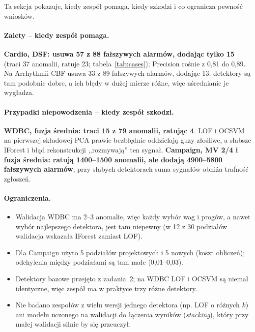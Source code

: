 \documentclass[11pt,a4paper]{article}
\begin{document}
Ta sekcja pokazuje, kiedy zespół pomaga, kiedy szkodzi i co ogranicza
pewność wniosków.

\begin{table}[H]
  \centering\small
  \caption{Decyzje zespołów a decyzje najlepszego pojedynczego detektora
  (część testowa, suma po podziałach): anomalie wykryte tylko przez zespół
  (uratowane) i tylko przez detektor (utracone) oraz fałszywe alarmy
  usunięte i dodane przez zespół.}
  \label{tab:cases}
\end{table}

\paragraph{Zalety -- kiedy zespół pomaga.} \textbf{Cardio, DSF: usuwa 57
z 88 fałszywych alarmów, dodając tylko 15} (traci 37 anomalii, ratuje 23;
tabela~\ref{tab:cases}); Precision rośnie z 0,81 do 0,89. Na Arrhythmii CBF
usuwa 33 z 89 fałszywych alarmów, dodając 13: detektory są tam podobnie
dobre, a ich błędy w dużej mierze różne, więc uśrednianie je wygładza.

\paragraph{Przypadki niepowodzenia -- kiedy zespół szkodzi.}
\textbf{WDBC, fuzja średnia: traci 15 z 79 anomalii, ratując 4}. LOF i OCSVM
na pierwszej składowej PCA prawie bezbłędnie oddzielają guzy złośliwe,
a słabsze IForest i błąd rekonstrukcji ,,rozmywają'' ten sygnał.
\textbf{Campaign, MV 2/4 i fuzja średnia: ratują 1400--1500 anomalii, ale
dodają 4900--5800 fałszywych alarmów}; przy słabych detektorach suma
sygnałów obniża trafność zgłoszeń.

\paragraph{Ograniczenia.}
\begin{itemize}
  \item Walidacja WDBC ma 2--3 anomalie, więc każdy wybór wag i progów, a
  nawet wybór najlepszego detektora, jest tam niepewny (w 12 z 30 podziałów
  walidacja wskazała IForest zamiast LOF).
  \item Dla Campaign użyto 5 podziałów projektowych i 5 nowych (koszt
  obliczeń); odchylenia między podziałami są tam małe (0,01--0,03).
  \item Detektory bazowe przejęto z zadania~2; na WDBC LOF i OCSVM są niemal
  identyczne, więc zespół ma w praktyce trzy różne detektory.
  \item Nie badano zespołów z wielu wersji jednego detektora (np. LOF
  o różnych $k$) ani modelu uczonego na walidacji do łączenia wyników
  (\emph{stacking}), który przy małej walidacji silnie by się przeuczył.
\end{itemize}
\end{document}
